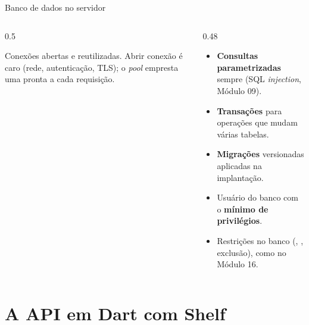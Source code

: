 \documentclass[aspectratio=169,10pt]{beamer}
\begin{document}
\begin{frame}{Banco de dados no servidor}
  \begin{columns}[T]
    \begin{column}{0.5\textwidth}
      \begin{definicao}
        Conexões abertas e reutilizadas. Abrir conexão é caro (rede, autenticação, TLS); o \emph{pool} empresta uma pronta a cada requisição.
      \end{definicao}
      \centering
    \end{column}
    \begin{column}{0.48\textwidth}
      \begin{conceito}[Práticas]
        \begin{itemize}
          \item \textbf{Consultas parametrizadas} sempre (SQL \emph{injection}, Módulo 09).
          \item \textbf{Transações} para operações que mudam várias tabelas.
          \item \textbf{Migrações} versionadas aplicadas na implantação.
          \item Usuário do banco com o \textbf{mínimo de privilégios}.
          \item Restrições no banco (, , exclusão), como no Módulo 16.
        \end{itemize}
      \end{conceito}
    \end{column}
  \end{columns}
\end{frame}

\section{A API em Dart com Shelf}
\end{document}
